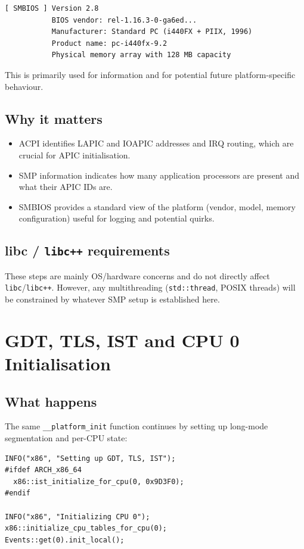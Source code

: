 \documentclass[a4paper,11pt]{article}
\begin{document}
\begin{verbatim}
[ SMBIOS ] Version 2.8
           BIOS vendor: rel-1.16.3-0-ga6ed...
           Manufacturer: Standard PC (i440FX + PIIX, 1996)
           Product name: pc-i440fx-9.2
           Physical memory array with 128 MB capacity
\end{verbatim}

This is primarily used for information and for potential future
platform-specific behaviour.

\subsection{Why it matters}

\begin{itemize}
  \item ACPI identifies LAPIC and IOAPIC addresses and IRQ routing, which
        are crucial for APIC initialisation.
  \item SMP information indicates how many application processors are
        present and what their APIC IDs are.
  \item SMBIOS provides a standard view of the platform (vendor, model,
        memory configuration) useful for logging and potential quirks.
\end{itemize}

\subsection{libc / \texorpdfstring{\texttt{libc++}}{libc++} requirements}

These steps are mainly OS/hardware concerns and do not directly affect
\texttt{libc}/\texttt{libc++}. However, any multithreading
(\texttt{std::thread}, POSIX threads) will be constrained by whatever
SMP setup is established here.

\section{GDT, TLS, IST and CPU 0 Initialisation}

\subsection{What happens}

The same \texttt{\_\_platform\_init} function continues by setting up
long-mode segmentation and per-CPU state:

\begin{verbatim}
INFO("x86", "Setting up GDT, TLS, IST");
#ifdef ARCH_x86_64
  x86::ist_initialize_for_cpu(0, 0x9D3F0);
#endif

INFO("x86", "Initializing CPU 0");
x86::initialize_cpu_tables_for_cpu(0);
Events::get(0).init_local();
\end{verbatim}
\end{document}
